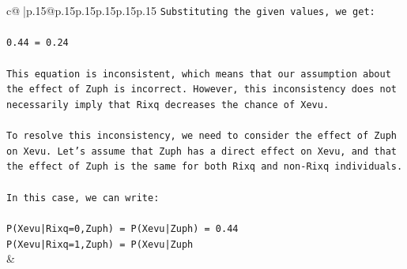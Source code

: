 \documentclass{article}
\begin{document}
{\begin{supertabular}{c@{$\;$}|p{.15\linewidth}@{}p{.15\linewidth}p{.15\linewidth}p{.15\linewidth}p{.15\linewidth}p{.15\linewidth}}
{{{\texttt{Substituting the given values, we get:} \\
\\ 
\texttt{0.44 = 0.24} \\
\\ 
\texttt{This equation is inconsistent, which means that our assumption about the effect of Zuph is incorrect. However, this inconsistency does not necessarily imply that Rixq decreases the chance of Xevu.} \\
\\ 
\texttt{To resolve this inconsistency, we need to consider the effect of Zuph on Xevu. Let's assume that Zuph has a direct effect on Xevu, and that the effect of Zuph is the same for both Rixq and non{-}Rixq individuals.} \\
\\ 
\texttt{In this case, we can write:} \\
\\ 
\texttt{P(Xevu|Rixq=0,Zuph) = P(Xevu|Zuph) = 0.44} \\
\texttt{P(Xevu|Rixq=1,Zuph) = P(Xevu|Zuph} \\
            }
        }
    }
    & \\ \\


\end{supertabular}}
\end{document}
